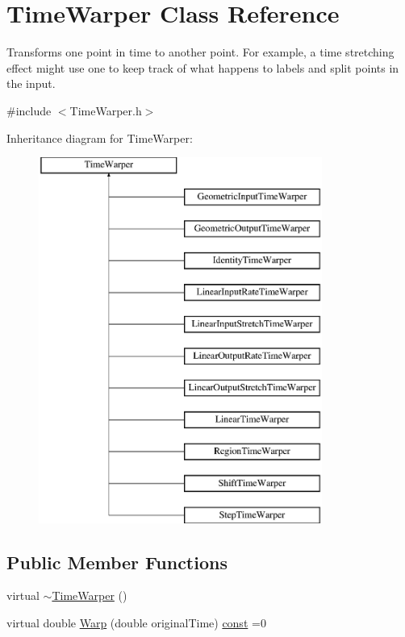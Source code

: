 \hypertarget{class_time_warper}{}\section{Time\+Warper Class Reference}
\label{class_time_warper}


Transforms one point in time to another point. For example, a time stretching effect might use one to keep track of what happens to labels and split points in the input.  




{\ttfamily \#include $<$Time\+Warper.\+h$>$}

Inheritance diagram for Time\+Warper\+:\begin{figure}[H]
\begin{center}
\leavevmode
\includegraphics[height=12.000000cm]{class_time_warper}
\end{center}
\end{figure}
\subsection*{Public Member Functions}
\begin{DoxyCompactItemize}
\item 
virtual \hyperlink{class_time_warper_aaf1f9032bbf5fbb039d274767f2b6ba0}{$\sim$\+Time\+Warper} ()
\item 
virtual double \hyperlink{class_time_warper_a23723ae122b6feed38614cdcc328a394}{Warp} (double original\+Time) \hyperlink{getopt1_8c_a2c212835823e3c54a8ab6d95c652660e}{const}  =0
\end{DoxyCompactItemize}


